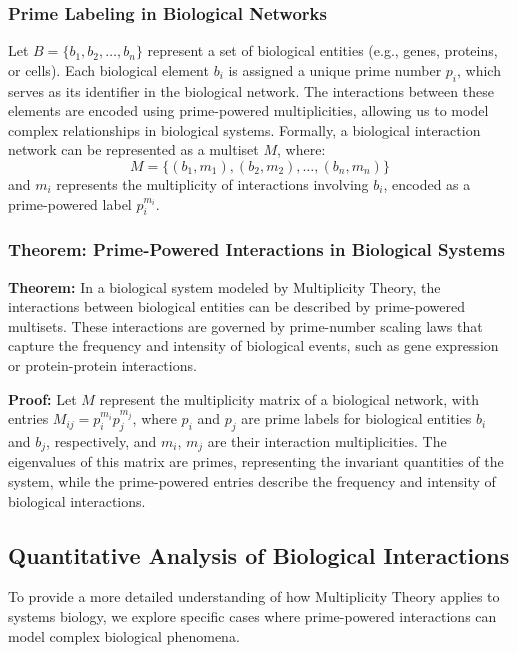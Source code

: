 \documentclass[%
 preprint, linenumbers,
 amsmath,amssymb,
 aps, physrev,
]{revtex4-2}
\begin{document}
\subsubsection{Prime Labeling in Biological Networks}
Let \( B = \{b_1, b_2, \dots, b_n\} \) represent a set of biological entities (e.g., genes, proteins, or cells). Each biological element \( b_i \) is assigned a unique prime number \( p_i \), which serves as its identifier in the biological network. The interactions between these elements are encoded using prime-powered multiplicities, allowing us to model complex relationships in biological systems. Formally, a biological interaction network can be represented as a multiset \( M \), where:
\[
M = \{ (b_1, m_1), (b_2, m_2), \dots, (b_n, m_n) \}
\]
and \( m_i \) represents the multiplicity of interactions involving \( b_i \), encoded as a prime-powered label \( p_i^{m_i} \).

\subsubsection{Theorem: Prime-Powered Interactions in Biological Systems}
\textbf{Theorem:} In a biological system modeled by Multiplicity Theory, the interactions between biological entities can be described by prime-powered multisets. These interactions are governed by prime-number scaling laws that capture the frequency and intensity of biological events, such as gene expression or protein-protein interactions.

\textbf{Proof:} Let \( M \) represent the multiplicity matrix of a biological network, with entries \( M_{ij} = p_i^{m_i} p_j^{m_j} \), where \( p_i \) and \( p_j \) are prime labels for biological entities \( b_i \) and \( b_j \), respectively, and \( m_i \), \( m_j \) are their interaction multiplicities. The eigenvalues of this matrix are primes, representing the invariant quantities of the system, while the prime-powered entries describe the frequency and intensity of biological interactions.

\subsection{Quantitative Analysis of Biological Interactions}
To provide a more detailed understanding of how Multiplicity Theory applies to systems biology, we explore specific cases where prime-powered interactions can model complex biological phenomena.
\end{document}
